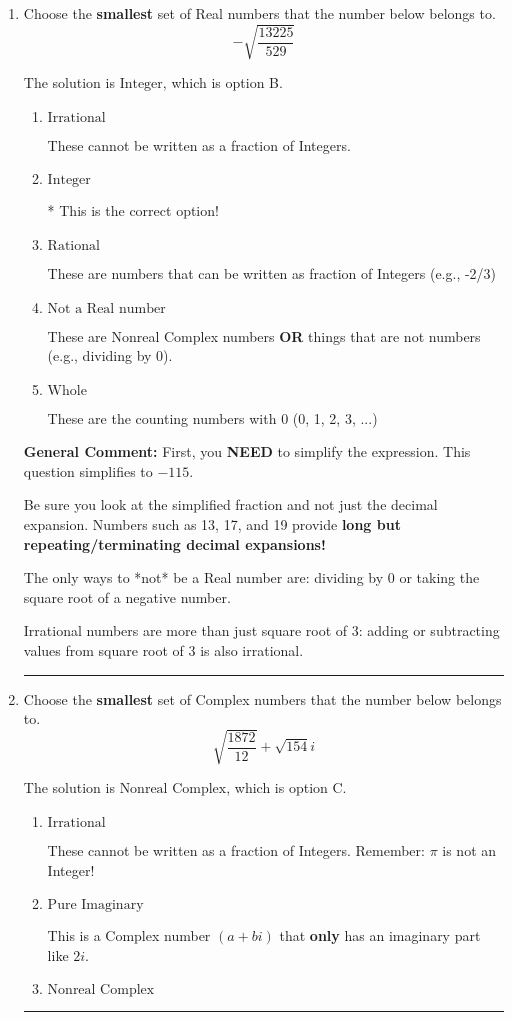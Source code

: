\documentclass{extbook}[14pt]
\newcommand{\litem}[1]{\item #1

\rule{\textwidth}{0.4pt}}
\begin{document}
\begin{enumerate}\litem{
Choose the \textbf{smallest} set of Real numbers that the number below belongs to.
\[ -\sqrt{\frac{13225}{529}} \]

The solution is \( \text{Integer} \), which is option B.\begin{enumerate}[label=\Alph*.]
\item \( \text{Irrational} \)

These cannot be written as a fraction of Integers.
\item \( \text{Integer} \)

* This is the correct option!
\item \( \text{Rational} \)

These are numbers that can be written as fraction of Integers (e.g., -2/3)
\item \( \text{Not a Real number} \)

These are Nonreal Complex numbers \textbf{OR} things that are not numbers (e.g., dividing by 0).
\item \( \text{Whole} \)

These are the counting numbers with 0 (0, 1, 2, 3, ...)
\end{enumerate}

\textbf{General Comment:} First, you \textbf{NEED} to simplify the expression. This question simplifies to $-115$. 
 
 Be sure you look at the simplified fraction and not just the decimal expansion. Numbers such as 13, 17, and 19 provide \textbf{long but repeating/terminating decimal expansions!} 
 
 The only ways to *not* be a Real number are: dividing by 0 or taking the square root of a negative number. 
 
 Irrational numbers are more than just square root of 3: adding or subtracting values from square root of 3 is also irrational.
}
\litem{
Choose the \textbf{smallest} set of Complex numbers that the number below belongs to.
\[ \sqrt{\frac{1872}{12}}+\sqrt{154} i \]

The solution is \( \text{Nonreal Complex} \), which is option C.\begin{enumerate}[label=\Alph*.]
\item \( \text{Irrational} \)

These cannot be written as a fraction of Integers. Remember: $\pi$ is not an Integer!
\item \( \text{Pure Imaginary} \)

This is a Complex number $(a+bi)$ that \textbf{only} has an imaginary part like $2i$.
\item \( \text{Nonreal Complex} \)


\end{enumerate}}
\end{enumerate}
\end{document}
